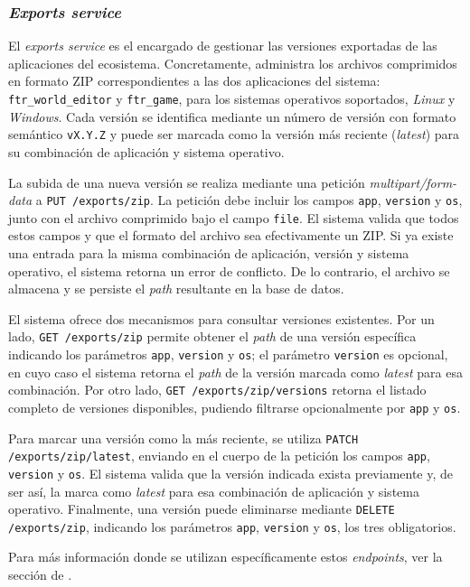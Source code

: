 \subsubsection{\textit{Exports service}}
\label{sec:exports-service}

El \textit{exports service} es el encargado de gestionar las versiones exportadas de las aplicaciones del ecosistema.
Concretamente, administra los archivos comprimidos en formato ZIP correspondientes a las dos aplicaciones del sistema:
\texttt{ftr\_world\_editor} y \texttt{ftr\_game}, para los sistemas operativos soportados, \textit{Linux} y
\textit{Windows}. Cada versión se identifica mediante un número de versión con formato semántico \texttt{vX.Y.Z} y
puede ser marcada como la versión más reciente (\textit{latest}) para su combinación de aplicación y sistema operativo.
\vspace{0.25cm}

La subida de una nueva versión se realiza mediante una petición \textit{multipart/form-data} a
\texttt{PUT /exports/zip}. La petición debe incluir los campos \texttt{app}, \texttt{version} y \texttt{os}, junto
con el archivo comprimido bajo el campo \texttt{file}. El sistema valida que todos estos campos y que el formato del archivo sea
efectivamente un ZIP. Si ya existe una entrada para la misma combinación de aplicación, versión y sistema operativo,
el sistema retorna un error de conflicto. De lo contrario, el archivo se almacena y se persiste el \textit{path}
resultante en la base de datos.
\vspace{0.25cm}

El sistema ofrece dos mecanismos para consultar versiones existentes. Por un lado, \texttt{GET /exports/zip} permite
obtener el \textit{path} de una versión específica indicando los parámetros \texttt{app}, \texttt{version} y
\texttt{os}; el parámetro \texttt{version} es opcional, en cuyo caso el sistema retorna el \textit{path} de la
versión marcada como \textit{latest} para esa combinación. Por otro lado, \texttt{GET /exports/zip/versions} retorna el 
listado completo de versiones disponibles, pudiendo filtrarse opcionalmente por \texttt{app} y \texttt{os}.
\vspace{0.25cm}

Para marcar una versión como la más reciente, se utiliza \texttt{PATCH /exports/zip/latest}, enviando en el cuerpo
de la petición los campos \texttt{app}, \texttt{version} y \texttt{os}. El sistema valida que la versión indicada
exista previamente y, de ser así, la marca como \textit{latest} para esa combinación de aplicación y sistema
operativo. Finalmente, una versión puede eliminarse mediante \texttt{DELETE /exports/zip}, indicando los parámetros 
\texttt{app}, \texttt{version} y \texttt{os}, los tres obligatorios.

Para más información donde se utilizan específicamente estos \textit{endpoints}, ver la sección de .

\vspace{0.25cm}

